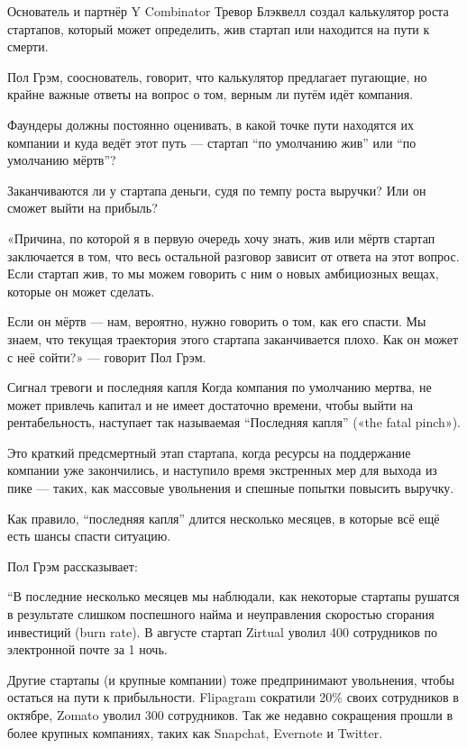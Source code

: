 \documentclass[ebook,12pt,oneside,openany]{memoir}
\date{}
\begin{document}
\maketitle

Основатель и партнёр Y Combinator Тревор Блэквелл создал калькулятор
роста стартапов, который может определить, жив стартап или находится
на пути к смерти.

Пол Грэм, сооснователь, говорит, что калькулятор предлагает пугающие,
но крайне важные ответы на вопрос о том, верным ли путём идёт
компания.


Фаундеры должны постоянно оценивать, в какой точке пути находятся их
компании и куда ведёт этот путь — стартап “по умолчанию жив” или “по
умолчанию мёртв”?

Заканчиваются ли у стартапа деньги, судя по темпу роста выручки? Или
он сможет выйти на прибыль?

«Причина, по которой я в первую очередь хочу знать, жив или мёртв
стартап заключается в том, что весь остальной разговор зависит от
ответа на этот вопрос. Если стартап жив, то мы можем говорить с ним о
новых амбициозных вещах, которые он может сделать.

Если он мёртв — нам, вероятно, нужно говорить о том, как его спасти.
Мы знаем, что текущая траектория этого стартапа заканчивается плохо.
Как он может с неё сойти?» — говорит Пол Грэм.

Сигнал тревоги и последняя капля Когда компания по умолчанию мертва,
не может привлечь капитал и не имеет достаточно времени, чтобы выйти
на рентабельность, наступает так называемая “Последняя капля” («the
fatal pinch»).

Это краткий предсмертный этап стартапа, когда ресурсы на поддержание
компании уже закончились, и наступило время экстренных мер для выхода
из пике — таких, как массовые увольнения и спешные попытки повысить
выручку.

Как правило, “последняя капля” длится несколько месяцев, в которые всё
ещё есть шансы спасти ситуацию.

Пол Грэм рассказывает:

“В последние несколько месяцев мы наблюдали, как некоторые стартапы
рушатся в результате слишком поспешного найма и неуправления скоростью
сгорания инвестиций (burn rate). В августе стартап Zirtual уволил 400
сотрудников по электронной почте за 1 ночь.

Другие стартапы (и крупные компании) тоже предпринимают увольнения,
чтобы остаться на пути к прибыльности. Flipagram сократили 20\% своих
сотрудников в октябре, Zomato уволил 300 сотрудников. Так же недавно
сокращения прошли в более крупных компаниях, таких как Snapchat,
Evernote и Twitter.
\end{document}
